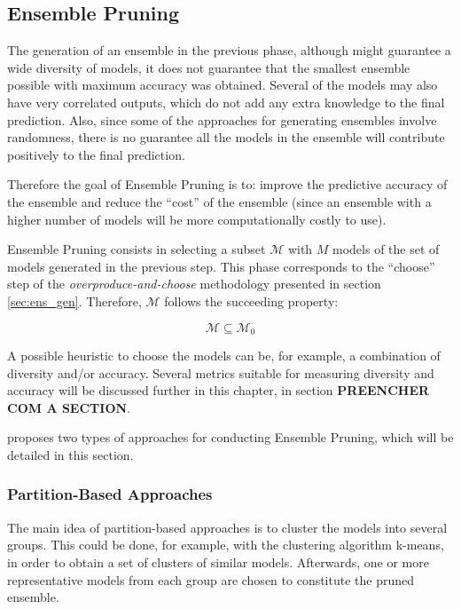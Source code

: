 \subsection{Ensemble Pruning}

The generation of an ensemble in the previous phase, although might guarantee a wide diversity of models, it does not guarantee that the smallest ensemble possible with maximum accuracy was obtained. Several of the models may also have very correlated outputs, which do not add any extra knowledge to the final prediction.
Also, since some of the approaches for generating ensembles involve randomness, there is no guarantee all the models in the ensemble will contribute positively to the final prediction.

Therefore the goal of Ensemble Pruning is to: improve the predictive accuracy of the ensemble and reduce the ``cost'' of the ensemble (since an ensemble with a higher number of models will be more computationally costly to use).

Ensemble Pruning consists in selecting a subset $\mathcal{M}$ with $M$ models of the set of models generated in the previous step.
This phase corresponds to the ``choose'' step of the \textit{overproduce-and-choose} methodology presented in section \ref{sec:ens_gen}. Therefore, $\mathcal{M}$ follows the succeeding property:

\begin{equation}
\mathcal{M} \subseteq \mathcal{M}_0
\end{equation}

A possible heuristic to choose the models can be, for example, a combination of diversity and/or accuracy. Several metrics suitable for measuring diversity and accuracy will be discussed further in this chapter, in section \textbf{PREENCHER COM A SECTION}.

\textcite{Mendes-Moreira2012} proposes two types of approaches for conducting Ensemble Pruning, which will be detailed in this section.

\subsubsection{Partition-Based Approaches}

The main idea of partition-based approaches is to cluster the models into several groups. This could be done, for example, with the clustering algorithm k-means, in order to obtain a set of clusters of similar models.
Afterwards, one or more representative models from each group are chosen to constitute the pruned ensemble.

